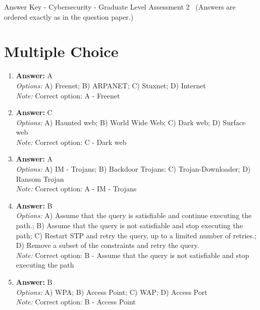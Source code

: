 \documentclass[12pt]{article}
\begin{document}
\begin{center}
Answer Key - Cybersecurity - Graduate Level Assessment 2 \
\small (Answers are ordered exactly as in the question paper.)
\end{center}

\section*{Multiple Choice}
\begin{enumerate}[label=\arabic*.]
\item \textbf{Answer:} A
\\ \textit{Options:} A) Freenet; B) ARPANET; C) Stuxnet; D) Internet
\\ \textit{Note:} Correct option: A - Freenet
\item \textbf{Answer:} C
\\ \textit{Options:} A) Haunted web; B) World Wide Web; C) Dark web; D) Surface web
\\ \textit{Note:} Correct option: C - Dark web
\item \textbf{Answer:} A
\\ \textit{Options:} A) IM - Trojans; B) Backdoor Trojans; C) Trojan-Downloader; D) Ransom Trojan
\\ \textit{Note:} Correct option: A - IM - Trojans
\item \textbf{Answer:} B
\\ \textit{Options:} A) Assume that the query is satisfiable and continue executing the path.; B) Assume that the query is not satisfiable and stop executing the path; C) Restart STP and retry the query, up to a limited number of retries.; D) Remove a subset of the constraints and retry the query.
\\ \textit{Note:} Correct option: B - Assume that the query is not satisfiable and stop executing the path
\item \textbf{Answer:} B
\\ \textit{Options:} A) WPA; B) Access Point; C) WAP; D) Access Port
\\ \textit{Note:} Correct option: B - Access Point
\end{enumerate}
\end{document}
